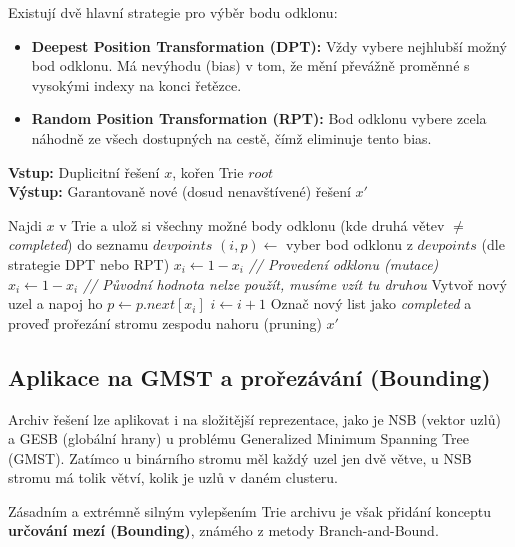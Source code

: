 \documentclass[12pt,a4paper]{article}
\theoremstyle{definition}
\begin{document}
Existují dvě hlavní strategie pro výběr bodu odklonu:
\begin{itemize}
    \item \textbf{Deepest Position Transformation (DPT):} Vždy vybere nejhlubší možný bod odklonu. Má nevýhodu (bias) v tom, že mění převážně proměnné s vysokými indexy na konci řetězce.
    \item \textbf{Random Position Transformation (RPT):} Bod odklonu vybere zcela náhodně ze všech dostupných na cestě, čímž eliminuje tento bias.
\end{itemize}

\begin{algorithm}[H]
\caption{Transformace řešení (Transform Solution v Trie)}
\textbf{Vstup:} Duplicitní řešení $x$, kořen Trie $root$ \\
\textbf{Výstup:} Garantovaně nové (dosud nenavštívené) řešení $x'$
\begin{algorithmic}[1]
\STATE Najdi $x$ v Trie a ulož si všechny možné body odklonu (kde druhá větev $\neq$ \textit{completed}) do seznamu $devpoints$
\STATE $(i, p) \gets$ vyber bod odklonu z $devpoints$ (dle strategie DPT nebo RPT)
\STATE $x_i \gets 1 - x_i$ \textit{// Provedení odklonu (mutace)}
        \STATE $x_i \gets 1 - x_i$ \textit{// Původní hodnota nelze použít, musíme vzít tu druhou}
    \ENDIF
        \STATE Vytvoř nový uzel a napoj ho
    \ENDIF
    \STATE $p \gets p.next[x_i]$
    \STATE $i \gets i + 1$
\ENDWHILE
\STATE Označ nový list jako \textit{completed} a proveď prořezání stromu zespodu nahoru (pruning)
\RETURN $x'$
\end{algorithmic}
\end{algorithm}

\subsection{Aplikace na GMST a prořezávání (Bounding)}
Archiv řešení lze aplikovat i na složitější reprezentace, jako je NSB (vektor uzlů) a GESB (globální hrany) u problému Generalized Minimum Spanning Tree (GMST). Zatímco u binárního stromu měl každý uzel jen dvě větve, u NSB stromu má tolik větví, kolik je uzlů v daném clusteru.

Zásadním a extrémně silným vylepšením Trie archivu je však přidání konceptu \textbf{určování mezí (Bounding)}, známého z metody Branch-and-Bound.
\end{document}
